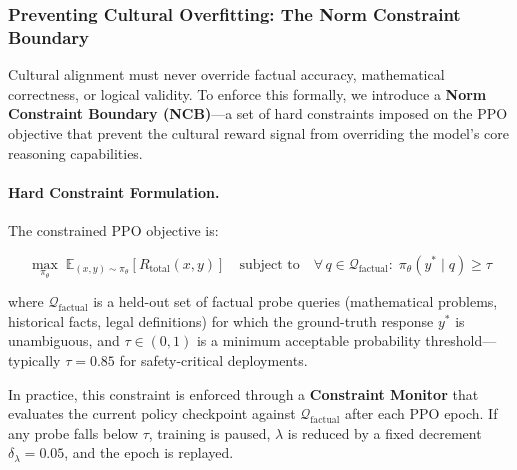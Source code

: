 \subsubsection{Preventing Cultural Overfitting: The Norm
               Constraint Boundary}
\label{subsubsec:norm-constraint}

Cultural alignment must never override factual accuracy,
mathematical correctness, or logical validity.
To enforce this formally, we introduce a
\textbf{Norm Constraint Boundary (NCB)}---a set of hard
constraints imposed on the PPO objective that prevent the cultural
reward signal from overriding the model's core reasoning
capabilities.

\paragraph{Hard Constraint Formulation.}
The constrained PPO objective is:

\begin{equation}
  \label{eq:constrained-ppo}
  \max_{\pi_\theta}\;
    \mathbb{E}_{(x,y) \sim \pi_\theta}\!\left[
      R_{\mathrm{total}}(x, y)
    \right]
  \quad
  \text{subject to}
  \quad
  \forall\, q \in \mathcal{Q}_{\mathrm{factual}}:\;
    \pi_\theta(y^{*} \mid q) \geq \tau
\end{equation}

where $\mathcal{Q}_{\mathrm{factual}}$ is a held-out set of
factual probe queries (mathematical problems, historical facts,
legal definitions) for which the ground-truth response $y^{*}$
is unambiguous, and $\tau \in (0, 1)$ is a minimum acceptable
probability threshold---typically $\tau = 0.85$ for
safety-critical deployments.

In practice, this constraint is enforced through a
\textbf{Constraint Monitor} that evaluates the current policy
checkpoint against $\mathcal{Q}_{\mathrm{factual}}$ after each
PPO epoch.
If any probe falls below $\tau$, training is paused, $\lambda$
is reduced by a fixed decrement $\delta_\lambda = 0.05$, and
the epoch is replayed.

